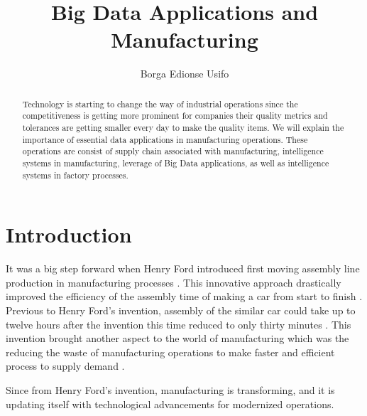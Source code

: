\documentclass[sigconf]{acmart}
\begin{document}
\title{Big Data Applications and Manufacturing}

\author{Borga Edionse Usifo}

\renewcommand{\shortauthors}{B. Usifo et al.}

\begin{abstract}
Technology is starting to change the way of industrial operations since the competitiveness is getting more prominent for companies their quality metrics and tolerances are getting smaller every day to make the quality items. We will explain the importance of essential data applications in manufacturing operations. These operations are consist of supply chain associated with manufacturing, intelligence systems in manufacturing, leverage of Big Data applications, as well as intelligence systems in factory processes.
\end{abstract}


\maketitle

\section{Introduction}

It was a big step forward when Henry Ford introduced first moving assembly line production in manufacturing processes \cite{www-ford}. This innovative approach drastically improved the efficiency of the assembly time of making a car from start to finish \cite{www-history}. Previous to Henry Ford's invention, assembly of the similar car could take up to twelve hours after the invention this time reduced to only thirty minutes \cite{www-history}. This invention brought another aspect to the world of manufacturing which was the reducing the waste of manufacturing operations to make faster and efficient process to supply demand \cite{www-industryweek}.

\par Since from Henry Ford's invention, manufacturing is transforming, and it is updating itself with technological advancements for modernized operations. 
\end{document}
